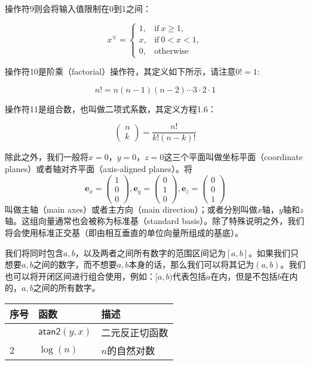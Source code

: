 \documentclass[
  paper=a4,
  ,captions=tableheading
]{scrartcl}
\begin{document}
操作符9则会将输入值限制在0到1之间：

\[
x^\mp = \left \{ 
\begin{array}{ll}
1, & \text{if} \ x \ge 1, \\
x, & \text{if} \ 0 < x < 1, \\
0, & \text{otherwise}
\end{array} 
\right.
\tag{1.4} 
\]

操作符10是阶乘（factorial）操作符，其定义如下所示，请注意\(0! = 1:\)

\[
n! = n(n-1)(n-2) \cdots 3 \cdot 2 \cdot 1 \tag{1.5}
\]

操作符11是组合数，也叫做二项式系数，其定义方程1.6：

\[
\left( \begin{array}{c} n \\ k  \end{array}\right) = 
\frac{n!}{k! (n-k)!} \tag{1.6}
\]

除此之外，我们一般将\(x = 0\)，\(y = 0\)，\(z = 0\)这三个平面叫做坐标平面（coordinate
planes）或者轴对齐平面（axis-aligned planes）。将 \[
\mathbf{e}_x = \left( \begin{array}{c} 1 \\ 0 \\ 0  \end{array} \right),
\mathbf{e}_y = \left( \begin{array}{c} 0 \\ 1 \\ 0  \end{array} \right),
\mathbf{e}_z = \left( \begin{array}{c} 0 \\ 0 \\ 1  \end{array} \right)
\] 叫做主轴（main axes）或者主方向（main
direction）；或者分别叫做\(x\)轴，\(y\)轴和\(z\)轴。这组向量通常也会被称为标准基（standard
basis）。除了特殊说明之外，我们将会使用标准正交基（即由相互垂直的单位向量所组成的基底）。

我们将同时包含\(a,b\)，以及两者之间所有数字的范围区间记为\([a,b]\)。如果我们只想要\(a,b\)之间的数字，而不想要\(a,b\)本身的话，那么我们可以将其记为\((a, b)\)。我们也可以将开闭区间进行组合使用，例如：\([a,b)\)代表包括\(a\)在内，但是不包括\(b\)在内的，\(a,b\)之间的所有数字。

\begin{longtable}[]{@{}lll@{}}
\toprule\noalign{}
序号 & 函数 & 描述 \\
\midrule\noalign{}
\endhead
\bottomrule\noalign{}
\endlastfoot
1 & \(\mathsf{atan2}(y, x)\) & 二元反正切函数 \\
2 & \(\log(n)\) & \(n\)的自然对数 \\
\end{longtable}
\end{document}
